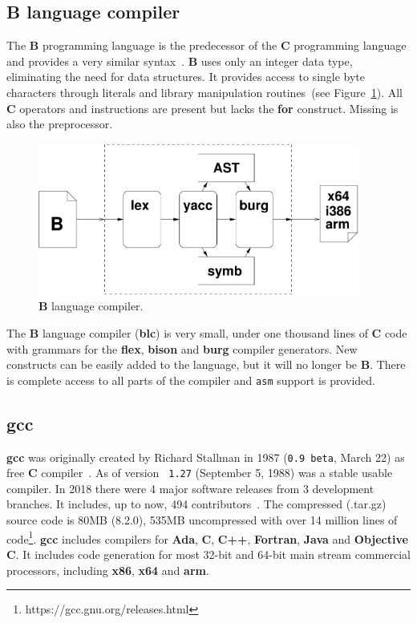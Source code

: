 \subsection{B language compiler}

The {\bf B} programming language is the predecessor of the {\bf C} programming
language and provides a very similar syntax~\cite{lang:b}.  {\bf B} uses only an
integer data type, eliminating the need for data structures.  It provides access
to single byte characters through literals and library manipulation
routines~(see Figure~\ref{fig:blc}).  All {\bf C} operators and instructions are
present but lacks the {\bf for} construct.  Missing is also the preprocessor.

\begin{figure}[!htbp]
    \centerline{\includegraphics[height=50mm]{Figures/blc.pdf}}
    \vspace{0cm}\caption{{\bf B} language compiler.}
    \label{fig:blc}
\end{figure}


The  {\bf B} language compiler ({\bf blc}) is very small, under one thousand lines of
{\bf C} code with grammars for the {\bf flex}, {\bf bison} and {\bf  burg} compiler generators. %
New constructs can be easily added to the language, but it will no longer be {\bf B}.
There is complete access to all parts of the compiler and {\tt asm} support is provided.

\subsection{gcc}

{\bf gcc} was originally created by Richard Stallman in 1987 ({\tt 0.9 beta},
March 22) as free {\bf C} compiler~\cite{Stallman:2009}.  As of version {\tt
  1.27} (September 5, 1988) was a stable usable compiler.  In 2018 there were 4
major software releases from 3 development branches.  It includes, up to now,
494 contributors~\cite{Stallman:2018}.  The compressed ({.tar.gz}) source code
is 80MB (8.2.0), 535MB uncompressed with over 14 million lines of
code\footnote{https://gcc.gnu.org/releases.html}.  {\bf
  gcc} includes compilers for {\bf Ada}, {\bf C}, {\bf C++}, {\bf Fortran}, {\bf
  Java} and {\bf Objective C}.  It includes code generation for most 32-bit and
64-bit main stream commercial processors, including {\bf x86}, {\bf x64} and
{\bf arm}.

